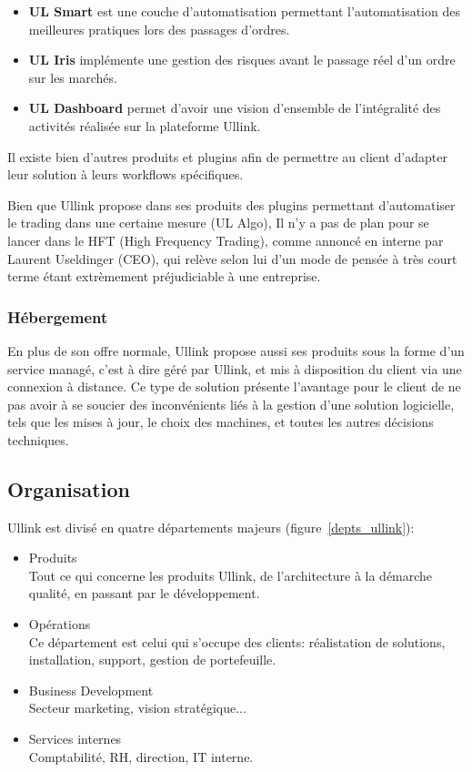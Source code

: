 \documentclass[a4paper, 12pt]{article}
\begin{document}
\begin{itemize}
\item{{\bf UL Smart} est une couche d'automatisation permettant l'automatisation des meilleures pratiques lors des passages d'ordres.}
\item{{\bf UL Iris} implémente une gestion des risques avant le passage réel d'un ordre sur les marchés.}
\item{{\bf UL Dashboard} permet d'avoir une vision d'ensemble de l'intégralité des activités réalisée sur la plateforme Ullink.}
\end{itemize}

Il existe bien d'autres produits et plugins afin de permettre au client d'adapter leur solution à leurs workflows spécifiques.

Bien que Ullink propose dans ses produits des plugins permettant d'automatiser le trading dans une certaine mesure (UL Algo), Il n'y a pas de plan pour se lancer dans le HFT (High Frequency Trading), comme annoncé en interne par Laurent Useldinger (CEO), qui relève selon lui d'un mode de pensée à très court terme étant extrèmement préjudiciable à une entreprise.

\subsubsection{Hébergement}

En plus de son offre normale, Ullink propose aussi ses produits sous la forme d'un service managé, c'est à dire géré par Ullink, et mis à disposition du client via une connexion à distance. Ce type de solution présente l'avantage pour le client de ne pas avoir à se soucier des inconvénients liés à la gestion d'une solution logicielle, tels que les mises à jour, le choix des machines, et toutes les autres décisions techniques.

\subsection{Organisation}

Ullink est divisé en quatre départements majeurs (figure~\ref{depts_ullink}):

\begin{itemize}
\item Produits\\
Tout ce qui concerne les produits Ullink, de l'architecture à la démarche qualité, en passant par le développement.

\item Opérations\\
Ce département est celui qui s'occupe des clients: réalistation de solutions, installation, support, gestion de portefeuille.

\item Business Development\\
Secteur marketing, vision stratégique...

\item Services internes\\
Comptabilité, RH, direction, IT interne.
\end{itemize}
\end{document}
